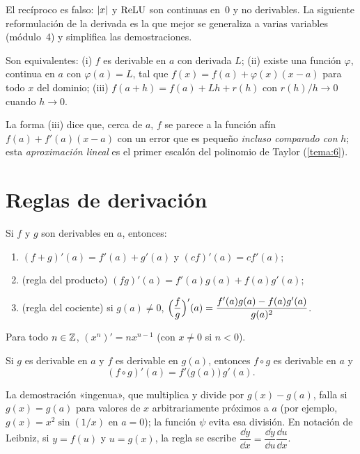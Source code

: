 El recíproco es falso: $\lvert x\rvert$ y $\operatorname{ReLU}$ son continuas en~0 y no derivables. La siguiente reformulación de la derivada es la que mejor se generaliza a varias variables (módulo~4) y simplifica las demostraciones.

\begin{proposicion}\label{prop:caratheodory}
Son equivalentes: (i) $f$ es derivable en $a$ con derivada $L$; (ii) existe una función $\varphi$, continua en $a$ con $\varphi(a)=L$, tal que $f(x)=f(a)+\varphi(x)(x-a)$ para todo $x$ del dominio; (iii) $f(a+h)=f(a)+Lh+r(h)$ con $r(h)/h\to0$ cuando $h\to0$.
\end{proposicion}

La forma (iii) dice que, cerca de $a$, $f$ se parece a la función afín $f(a)+f'(a)(x-a)$ con un error que es pequeño \emph{incluso comparado con} $h$; esta \emph{aproximación lineal} es el primer escalón del polinomio de Taylor (\cref{tema:6}).

\section{Reglas de derivación}

\begin{teorema}\label{teo:reglas}
Si $f$ y $g$ son derivables en $a$, entonces:
\begin{enumerate}
  \item $(f+g)'(a)=f'(a)+g'(a)$ y $(cf)'(a)=cf'(a)$;
  \item (regla del producto) $(fg)'(a)=f'(a)g(a)+f(a)g'(a)$;
  \item (regla del cociente) si $g(a)\ne0$, $\Bigl(\dfrac fg\Bigr)'(a)=\dfrac{f'(a)g(a)-f(a)g'(a)}{g(a)^{2}}$.
\end{enumerate}
\end{teorema}

\begin{proposicion}\label{prop:potencias}
Para todo $n\in\mathbb{Z}$, $(x^{n})'=nx^{n-1}$ (con $x\ne0$ si $n<0$).
\end{proposicion}

\begin{teorema}\label{teo:cadena}
Si $g$ es derivable en $a$ y $f$ es derivable en $g(a)$, entonces $f\circ g$ es derivable en $a$ y
\[
(f\circ g)'(a)=f'\bigl(g(a)\bigr)\,g'(a).
\]
\end{teorema}

La demostración «ingenua», que multiplica y divide por $g(x)-g(a)$, falla si $g(x)=g(a)$ para valores de $x$ arbitrariamente próximos a $a$ (por ejemplo, $g(x)=x^{2}\sin(1/x)$ en $a=0$); la función $\psi$ evita esa división. En notación de Leibniz, si $y=f(u)$ y $u=g(x)$, la regla se escribe $\dfrac{\dd y}{\dd x}=\dfrac{\dd y}{\dd u}\dfrac{\dd u}{\dd x}$.

